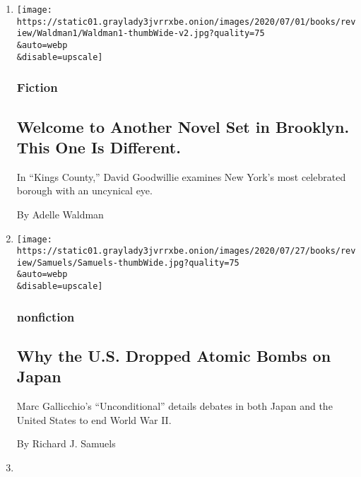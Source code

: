 \begin{enumerate}
\def\labelenumi{\arabic{enumi}.}
\item
  \href{/2020/08/03/books/review/kings-county-david-goodwillie.html}{}

  \texttt{[image: https://static01.graylady3jvrrxbe.onion/images/2020/07/01/books/review/Waldman1/Waldman1-thumbWide-v2.jpg?quality=75\\\&auto=webp\\\&disable=upscale]}

  \hypertarget{fiction-3}{%
  \subsubsection{Fiction}\label{fiction-3}}

  \hypertarget{welcome-to-another-novel-set-in-brooklyn-this-one-is-different}{%
  \subsection{Welcome to Another Novel Set in Brooklyn. This One Is
  Different.}\label{welcome-to-another-novel-set-in-brooklyn-this-one-is-different}}

  In ``Kings County,'' David Goodwillie examines New York's most
  celebrated borough with an uncynical eye.

  By Adelle Waldman
\item
  \href{/2020/08/03/books/review/unconditional-marc-gallicchio.html}{}

  \texttt{[image: https://static01.graylady3jvrrxbe.onion/images/2020/07/27/books/review/Samuels/Samuels-thumbWide.jpg?quality=75\\\&auto=webp\\\&disable=upscale]}

  \hypertarget{nonfiction-5}{%
  \subsubsection{nonfiction}\label{nonfiction-5}}

  \hypertarget{why-the-us-dropped-atomic-bombs-on-japan}{%
  \subsection{Why the U.S. Dropped Atomic Bombs on
  Japan}\label{why-the-us-dropped-atomic-bombs-on-japan}}

  Marc Gallicchio's ``Unconditional'' details debates in both Japan and
  the United States to end World War II.

  By Richard J. Samuels
\item
  \href{/2020/08/01/books/review/carrie-firestone-dress-coded.html}{}


\end{enumerate}

